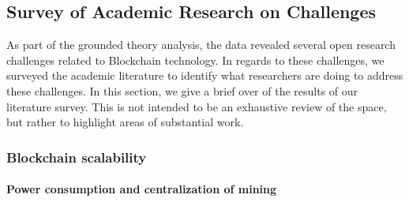 
\subsection{Survey of Academic Research on Challenges}
\label{sec:academic}
As part of the grounded theory analysis, the data revealed several open research challenges related to Blockchain technology.
In regards to these challenges, we surveyed the academic literature to identify what researchers are doing to address these challenges.
In this section, we give a brief over of the results of our literature survey.
This is not intended to be an exhaustive review of the space, but rather to highlight areas of substantial work.

\subsubsection{Blockchain scalability}

\paragraph{Power consumption and centralization of mining}

